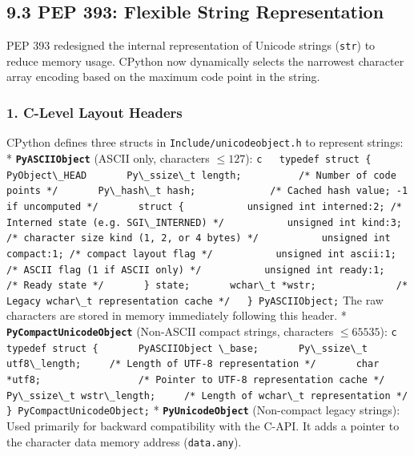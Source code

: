 \hypertarget{pep-393-flexible-string-representation}{%
\subsection{9.3 PEP 393: Flexible String
Representation}\label{pep-393-flexible-string-representation}}

PEP 393 redesigned the internal representation of Unicode strings
(\passthrough{\lstinline!str!}) to reduce memory usage. CPython now
dynamically selects the narrowest character array encoding based on the
maximum code point in the string.

\hypertarget{c-level-layout-headers}{%
\subsubsection{1. C-Level Layout Headers}\label{c-level-layout-headers}}

CPython defines three structs in
\passthrough{\lstinline!Include/unicodeobject.h!} to represent strings:
* \textbf{\passthrough{\lstinline!PyASCIIObject!}} (ASCII only,
characters \(\le 127\)):
\passthrough{\lstinline!c   typedef struct \{       PyObject\_HEAD       Py\_ssize\_t length;          /* Number of code points */       Py\_hash\_t hash;             /* Cached hash value; -1 if uncomputed */       struct \{           unsigned int interned:2; /* Interned state (e.g. SGI\_INTERNED) */           unsigned int kind:3;    /* character size kind (1, 2, or 4 bytes) */           unsigned int compact:1; /* compact layout flag */           unsigned int ascii:1;   /* ASCII flag (1 if ASCII only) */           unsigned int ready:1;   /* Ready state */       \} state;       wchar\_t *wstr;              /* Legacy wchar\_t representation cache */   \} PyASCIIObject;!}
The raw characters are stored in memory immediately following this
header. * \textbf{\passthrough{\lstinline!PyCompactUnicodeObject!}}
(Non-ASCII compact strings, characters \(\le 65535\)):
\passthrough{\lstinline!c   typedef struct \{       PyASCIIObject \_base;       Py\_ssize\_t utf8\_length;     /* Length of UTF-8 representation */       char *utf8;                 /* Pointer to UTF-8 representation cache */       Py\_ssize\_t wstr\_length;     /* Length of wchar\_t representation */   \} PyCompactUnicodeObject;!}
* \textbf{\passthrough{\lstinline!PyUnicodeObject!}} (Non-compact legacy
strings): Used primarily for backward compatibility with the C-API. It
adds a pointer to the character data memory address
(\passthrough{\lstinline!data.any!}).

